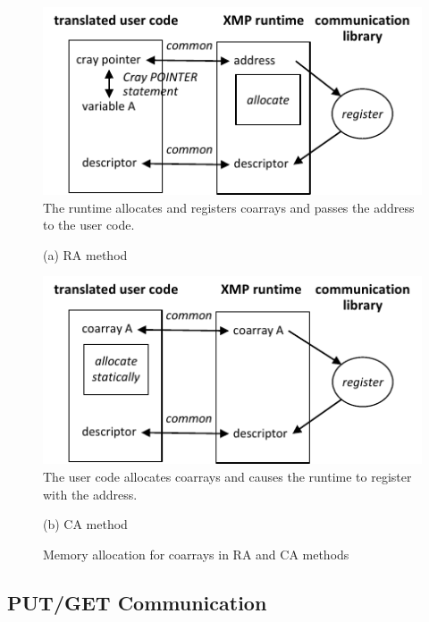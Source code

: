 \begin{figure}[tbh]
 \begin{center}
  \includegraphics[scale=0.9, trim=0mm 0mm 0mm 0mm, clip]{figs/register-RA-tmp.pdf}\\
The runtime allocates and registers coarrays and passes the address to the user code.
 \end{center}
 \begin{center}
(a) RA method
 \end{center}
 \begin{center}
  \includegraphics[scale=0.9, trim=0mm 0mm 0mm 0mm, clip]{figs/register-CA-tmp.pdf}\\
The user code allocates coarrays and causes the runtime to register with the address.
 \end{center}
 \begin{center}
(b) CA method
 \end{center}
 \caption{Memory allocation for coarrays in RA and CA methods}
 \label{fig:register-RA-CA}
\end{figure}


\subsection{PUT/GET Communication}

